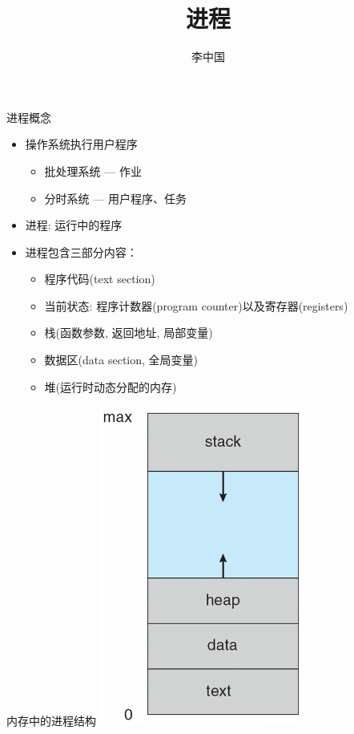 \documentclass[xcolor=svgnames]{beamer}
\begin{document}
\begin{CJK*}{UTF8}{gbsn}


\title{进程}

\author{李中国}
\date{}

\begin{frame}
  \titlepage
\end{frame}


\begin{frame}{进程概念}
\begin{itemize}
\item 操作系统执行用户程序
\begin{itemize}
\item 批处理系统 --- 作业
\item 分时系统 --- 用户程序、任务
\end{itemize}
\item 进程: 运行中的程序 
\item 进程包含三部分内容：
\begin{itemize}
\item 程序代码(text section)
\item 当前状态: 程序计数器(program counter)以及寄存器(registers)
\item 栈(函数参数, 返回地址, 局部变量)
\item 数据区(data section, 全局变量)
\item 堆(运行时动态分配的内存)
\end{itemize}
\end{itemize}
\end{frame}

\begin{frame}{内存中的进程结构}
\includegraphics[width=0.5\textwidth]{process.png}
\end{frame}


\end{CJK*}
\end{document}
